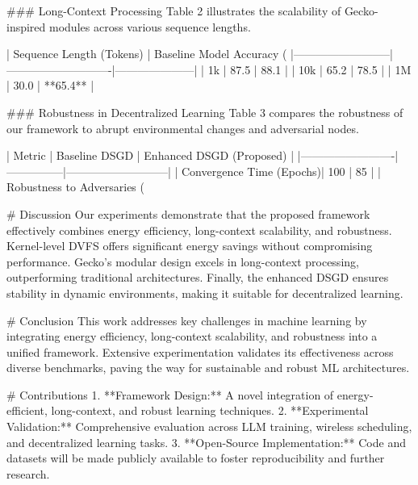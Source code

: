 ### Long-Context Processing  
Table 2 illustrates the scalability of Gecko-inspired modules across various sequence lengths.  

| Sequence Length (Tokens) | Baseline Model Accuracy (%
|--------------------------|----------------------------|---------------------|  
| 1k                       | 87.5                       | 88.1                |  
| 10k                      | 65.2                       | 78.5                |  
| 1M                       | 30.0                       | **65.4**            |  

### Robustness in Decentralized Learning  
Table 3 compares the robustness of our framework to abrupt environmental changes and adversarial nodes.  

| Metric                  | Baseline DSGD | Enhanced DSGD (Proposed) |  
|-------------------------|---------------|---------------------------|  
| Convergence Time (Epochs)| 100          | 85                        |  
| Robustness to Adversaries (%

# Discussion  
Our experiments demonstrate that the proposed framework effectively combines energy efficiency, long-context scalability, and robustness. Kernel-level DVFS offers significant energy savings without compromising performance. Gecko's modular design excels in long-context processing, outperforming traditional architectures. Finally, the enhanced DSGD ensures stability in dynamic environments, making it suitable for decentralized learning.  

# Conclusion  
This work addresses key challenges in machine learning by integrating energy efficiency, long-context scalability, and robustness into a unified framework. Extensive experimentation validates its effectiveness across diverse benchmarks, paving the way for sustainable and robust ML architectures.  

# Contributions  
1. **Framework Design:** A novel integration of energy-efficient, long-context, and robust learning techniques.  
2. **Experimental Validation:** Comprehensive evaluation across LLM training, wireless scheduling, and decentralized learning tasks.  
3. **Open-Source Implementation:** Code and datasets will be made publicly available to foster reproducibility and further research.  